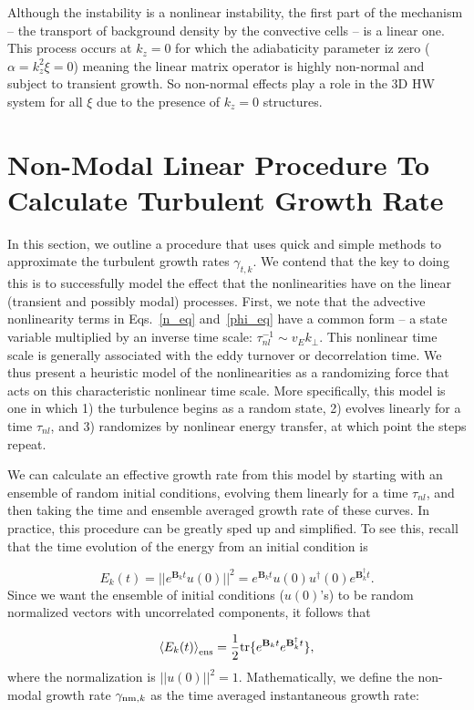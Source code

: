 \documentclass[twocolumn,showkeys,superscriptaddress]{revtex4}
\def\beq{\begin{equation}}
\def\eeq{\end{equation}}
\begin{document}
Although the instability is a nonlinear instability, the first part of the mechanism -- the transport of background density by the convective cells -- is a linear one. This process occurs at $k_z=0$
for which the adiabaticity parameter iz zero ($\alpha = k_z^2 \xi = 0$) meaning the linear matrix operator is highly non-normal and subject to transient growth.
So non-normal effects play a role in the 3D HW system for all $\xi$ due to the presence of $k_z=0$ structures.

\section{Non-Modal Linear Procedure To Calculate Turbulent Growth Rate}
\label{sec_nm_procedure}

In this section, we outline a procedure that uses quick and simple methods to approximate the turbulent growth rates $\gamma_{t,k}$.
We contend that the key to doing this is to successfully model the effect that the nonlinearities have on the linear (transient and possibly modal) processes.
First, we note that the advective nonlinearity terms in Eqs.~\ref{n_eq} and~\ref{phi_eq} have a common form -- a state variable multiplied by an inverse time scale:
$\tau_{nl}^{-1} \sim v_E k_\perp$.
This nonlinear time scale is generally associated with the eddy turnover or decorrelation time. We thus present a heuristic model of the nonlinearities 
as a randomizing force that acts on this characteristic nonlinear time scale. More specifically, this model is one in which 1) the turbulence begins as a random state, 
2) evolves linearly for a time $\tau_{nl}$, and 3) randomizes by nonlinear energy transfer, at which point the steps repeat.

We can calculate an effective growth rate from this model by starting with an ensemble of random initial conditions, evolving them linearly for a time $\tau_{nl}$, and
then taking the time and ensemble averaged growth rate of these curves.
In practice, this procedure can be greatly sped up and simplified. To see this, recall that the time evolution of the energy from an initial condition is

\beq
\label{E_t_from_u0}
E_k(t) = ||e^{\mathbf{B}_k t} u(0)||^2 = e^{\mathbf{B}_k t} u(0) u^{\dagger}(0) e^{\mathbf{B}_k^{\dagger}t}.
\eeq
Since we want the ensemble of initial conditions ($u(0)$'s) to be random normalized vectors with uncorrelated components, it follows that~\cite{camargo1998}

\beq
\label{E_t_ensemble_avg}
\left< E_k(t) \right>_{{\rm{ens}}} = \frac{1}{2} {\rm{tr}} \{ e^{\mathbf{B}_k t} e^{\mathbf{B}_k^{\dagger}t} \},
\eeq
where the normalization is $||u(0)||^2 = 1$. Mathematically, we define the non-modal growth rate $\gamma_{{\rm{nm}},k}$ as the time averaged instantaneous growth rate:
\end{document}
